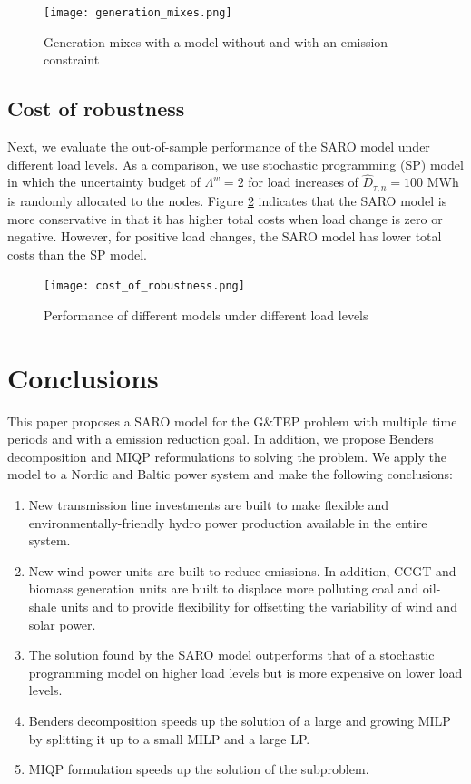 \documentclass[final]{IEEEtran}
\begin{document}
\begin{figure}[htpb]
	\centering
	\texttt{[image: generation\_mixes.png]}
	\caption{Generation mixes with a model without and with an emission constraint}
	\label{fig_generation_mixes}
\end{figure}

\subsection{Cost of robustness}

Next, we evaluate the out-of-sample performance of the SARO model under different load levels. As a comparison, we use stochastic programming (SP) model in which the uncertainty budget of $\Lambda^w = 2$ for load increases of $\hat{D}_{\tau, n} = 100 \textrm{ MWh}$ is randomly allocated to the nodes. Figure \ref{fig_cost_of_robustness} indicates that the SARO model is more conservative in that it has higher total costs when load change is zero or negative. However, for positive load changes, the SARO model has lower total costs than the SP model.

\begin{figure}[htpb]
	\centering
	\texttt{[image: cost\_of\_robustness.png]}
	\caption{Performance of different models under different load levels}
	\label{fig_cost_of_robustness}
\end{figure}

\section{Conclusions}
\label{section_conclusions}

This paper proposes a SARO model for the G\&TEP problem with multiple time periods and with a emission reduction goal. In addition, we propose Benders decomposition and MIQP reformulations to solving the problem. We apply the model to a Nordic and Baltic power system and make the following conclusions:

\begin{enumerate}
	\item New transmission line investments are built to make flexible and environmentally-friendly hydro power production available in the entire system.
	\item New wind power units are built to reduce emissions. In addition, CCGT and biomass generation units are built to displace more polluting coal and oil-shale units and to provide flexibility for offsetting the variability of wind and solar power.
	\item The solution found by the SARO model outperforms that of a stochastic programming model on higher load levels but is more expensive on lower load levels.
	\item Benders decomposition speeds up the solution of a large and growing MILP by splitting it up to a small MILP and a large LP.
	\item MIQP formulation speeds up the solution of the subproblem.
\end{enumerate}
\end{document}
